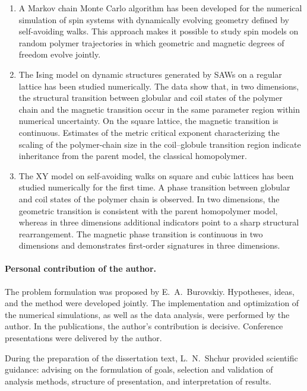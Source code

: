 \begin{enumerate}
\item A Markov chain Monte Carlo algorithm has been developed for the numerical simulation of spin systems with dynamically evolving geometry defined by self-avoiding walks. This approach makes it possible to study spin models on random polymer trajectories in which geometric and magnetic degrees of freedom evolve jointly.
\item The Ising model on dynamic structures generated by SAWs on a regular lattice has been studied numerically. The data show that, in two dimensions, the structural transition between globular and coil states of the polymer chain and the magnetic transition occur in the same parameter region within numerical uncertainty. On the square lattice, the magnetic transition is continuous. Estimates of the metric critical exponent characterizing the scaling of the polymer-chain size in the coil--globule transition region indicate inheritance from the parent model, the classical homopolymer.
\item The XY model on self-avoiding walks on square and cubic lattices has been studied numerically for the first time. A phase transition between globular and coil states of the polymer chain is observed. In two dimensions, the geometric transition is consistent with the parent homopolymer model, whereas in three dimensions additional indicators point to a sharp structural rearrangement. The magnetic phase transition is continuous in two dimensions and demonstrates first-order signatures in three dimensions.
\end{enumerate}


\paragraph*{Personal contribution of the author.}

The problem formulation was proposed by E.~A.~Burovskiy. Hypotheses, ideas, and the method were developed jointly. The implementation and optimization of the numerical simulations, as well as the data analysis, were performed by the author. In the publications, the author’s contribution is decisive. Conference presentations were delivered by the author.

During the preparation of the dissertation text, L.~N.~Shchur provided scientific guidance: advising on the formulation of goals, selection and validation of analysis methods, structure of presentation, and interpretation of results.


